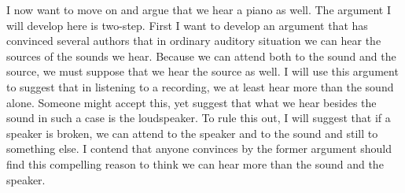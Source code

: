 \documentclass[sloppy, journal, git, bytitle, dodraft]{humapap}
\begin{document}




\sect I now want to move on and argue that we hear a piano as well. The argument I will develop here is two-step. 
	First I want to develop an argument that has convinced several authors that in ordinary auditory situation we can hear the sources of the sounds we hear. Because we can attend both to the sound and the source, we must suppose that we hear the source as well. I will use this argument to suggest that in listening to a recording, we at least hear more than the sound alone. 
	Someone might accept this, yet suggest that what we hear besides the sound in such a case is the loudspeaker. To rule this out, I will suggest that if a speaker is broken, we can attend to the speaker and to the sound and still to something else. I contend that anyone convinces by the former argument should find this compelling reason to think we can hear more than the sound and the speaker.
\end{document}
